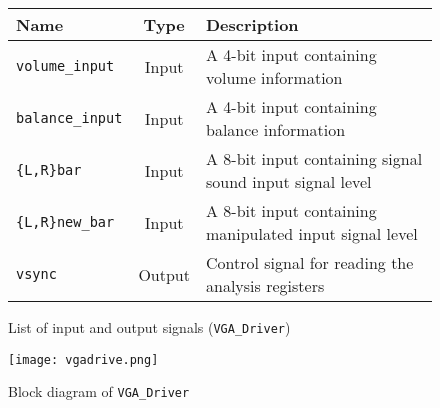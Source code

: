 \begin{figure}[H]
  \centering
  \caption{List of input and output signals (\texttt{VGA\_Driver})}
  \label{tab:vgaio}
    \begin{tabular}{|l|c|l|}
      \hline
      Name & Type & Description \\
      \hline
      \verb+volume_input+ & Input & A 4-bit input containing volume information\\
      \hline
      \verb+balance_input+ & Input & A 4-bit input containing balance information\\
      \hline
      \verb+{L,R}bar+ & Input & A 8-bit input containing signal sound input signal level\\
      \hline
      \verb+{L,R}new_bar+ & Input & A 8-bit input containing manipulated input signal level\\
      \hline
   	\verb+vsync+ & Output & Control signal for reading the analysis registers\\
      \hline
      
    \end{tabular}
\end{figure}
\begin{figure}[H]
        \centering
        \texttt{[image: vgadrive.png]} 
        \caption{Block diagram of \texttt{VGA\_Driver}}
        \label{fig:VGAdrive}
\end{figure}


 
